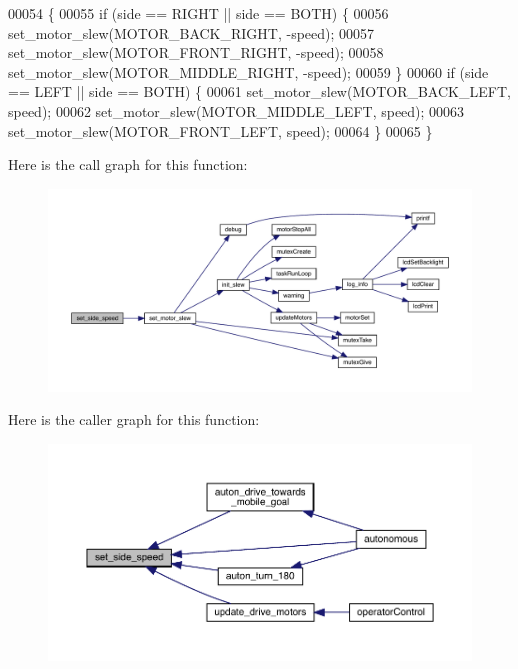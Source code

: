 \begin{DoxyCode}
00054                                             \{
00055   \textcolor{keywordflow}{if} (side == RIGHT || side == BOTH) \{
00056     set_motor_slew(MOTOR\_BACK\_RIGHT, -speed);
00057     set_motor_slew(MOTOR\_FRONT\_RIGHT, -speed);
00058     set_motor_slew(MOTOR\_MIDDLE\_RIGHT, -speed);
00059   \}
00060   \textcolor{keywordflow}{if} (side == LEFT || side == BOTH) \{
00061     set_motor_slew(MOTOR\_BACK\_LEFT, speed);
00062     set_motor_slew(MOTOR\_MIDDLE\_LEFT, speed);
00063     set_motor_slew(MOTOR\_FRONT\_LEFT, speed);
00064   \}
00065 \}
\end{DoxyCode}
Here is the call graph for this function\+:
\nopagebreak
\begin{figure}[H]
\begin{center}
\leavevmode
\includegraphics[width=350pt]{drive_8h_a8df41fd50094c065eedc81fc5e6595d1_cgraph}
\end{center}
\end{figure}
Here is the caller graph for this function\+:
\nopagebreak
\begin{figure}[H]
\begin{center}
\leavevmode
\includegraphics[width=350pt]{drive_8h_a8df41fd50094c065eedc81fc5e6595d1_icgraph}
\end{center}
\end{figure}
\mbox{\label{drive_8h_a53d6e35d53ec3e0b1b1c489d8203f204}} 
